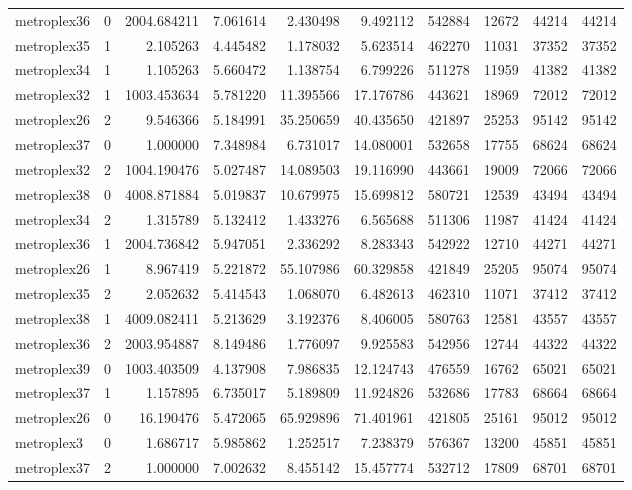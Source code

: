 \begin{longtable}{|l|r|r|r|r|r|r|r|r|r|}
metroplex36 & 0 & 2004.684211 & 7.061614 & 2.430498 & 9.492112 & 542884 & 12672 & 44214 & 44214 \\
metroplex35 & 1 & 2.105263 & 4.445482 & 1.178032 & 5.623514 & 462270 & 11031 & 37352 & 37352 \\
metroplex34 & 1 & 1.105263 & 5.660472 & 1.138754 & 6.799226 & 511278 & 11959 & 41382 & 41382 \\
metroplex32 & 1 & 1003.453634 & 5.781220 & 11.395566 & 17.176786 & 443621 & 18969 & 72012 & 72012 \\
metroplex26 & 2 & 9.546366 & 5.184991 & 35.250659 & 40.435650 & 421897 & 25253 & 95142 & 95142 \\
metroplex37 & 0 & 1.000000 & 7.348984 & 6.731017 & 14.080001 & 532658 & 17755 & 68624 & 68624 \\
metroplex32 & 2 & 1004.190476 & 5.027487 & 14.089503 & 19.116990 & 443661 & 19009 & 72066 & 72066 \\
metroplex38 & 0 & 4008.871884 & 5.019837 & 10.679975 & 15.699812 & 580721 & 12539 & 43494 & 43494 \\
metroplex34 & 2 & 1.315789 & 5.132412 & 1.433276 & 6.565688 & 511306 & 11987 & 41424 & 41424 \\
metroplex36 & 1 & 2004.736842 & 5.947051 & 2.336292 & 8.283343 & 542922 & 12710 & 44271 & 44271 \\
metroplex26 & 1 & 8.967419 & 5.221872 & 55.107986 & 60.329858 & 421849 & 25205 & 95074 & 95074 \\
metroplex35 & 2 & 2.052632 & 5.414543 & 1.068070 & 6.482613 & 462310 & 11071 & 37412 & 37412 \\
metroplex38 & 1 & 4009.082411 & 5.213629 & 3.192376 & 8.406005 & 580763 & 12581 & 43557 & 43557 \\
metroplex36 & 2 & 2003.954887 & 8.149486 & 1.776097 & 9.925583 & 542956 & 12744 & 44322 & 44322 \\
metroplex39 & 0 & 1003.403509 & 4.137908 & 7.986835 & 12.124743 & 476559 & 16762 & 65021 & 65021 \\
metroplex37 & 1 & 1.157895 & 6.735017 & 5.189809 & 11.924826 & 532686 & 17783 & 68664 & 68664 \\
metroplex26 & 0 & 16.190476 & 5.472065 & 65.929896 & 71.401961 & 421805 & 25161 & 95012 & 95012 \\
metroplex3 & 0 & 1.686717 & 5.985862 & 1.252517 & 7.238379 & 576367 & 13200 & 45851 & 45851 \\
metroplex37 & 2 & 1.000000 & 7.002632 & 8.455142 & 15.457774 & 532712 & 17809 & 68701 & 68701 \\

\end{longtable}
